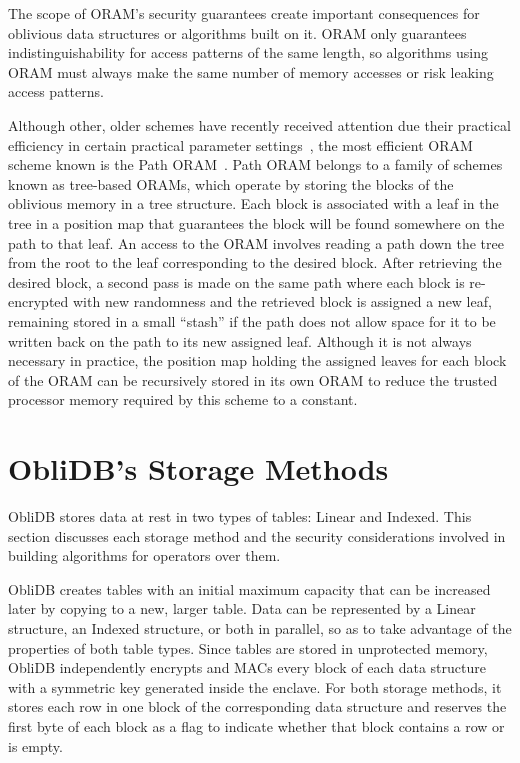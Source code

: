 \documentclass[letterpaper,twocolumn,10pt]{article}
\def\name/{ObliDB}
\begin{document}
The scope of ORAM's security guarantees create important consequences for oblivious data structures or algorithms built on it. ORAM only guarantees indistinguishability for access patterns of the same length, so algorithms using ORAM must always make the same number of memory accesses or risk leaking access patterns.

Although other, older schemes have recently received attention due their practical efficiency in certain practical parameter settings~\cite{ZWR+16}, the most efficient ORAM scheme known is the Path ORAM~\cite{SDS+13}. Path ORAM belongs to a family of schemes known as tree-based ORAMs, which operate by storing the blocks of the oblivious memory in a tree structure. Each block is associated with a leaf in the tree in a position map that guarantees the block will be found somewhere on the path to that leaf. An access to the ORAM involves reading a path down the tree from the root to the leaf corresponding to the desired block. After retrieving the desired block, a second pass is made on the same path where each block is re-encrypted with new randomness and the retrieved block is assigned a new leaf, remaining stored in a small ``stash'' if the path does not allow space for it to be written back on the path to its new assigned leaf. Although it is not always necessary in practice, the position map holding the assigned leaves for each block of the ORAM can be recursively stored in its own ORAM to reduce the trusted processor memory required by this scheme to a constant.

\section{\name/'s Storage Methods}\label{oblivData}
\name/ stores data at rest in two types of tables: Linear and Indexed. This section discusses each storage method and the security considerations involved in building algorithms for operators over them.

\name/ creates tables with an initial maximum capacity that can be increased later by copying to a new, larger table. Data can be represented by a Linear structure, an Indexed structure, or both in parallel, so as to take advantage of the properties of both table types. Since tables are stored in unprotected memory, \name/ independently encrypts and MACs every block of each data structure with a symmetric key generated inside the enclave. For both storage methods, it stores each row in one block of the corresponding data structure and reserves the first byte of each block as a flag to indicate whether that block contains a row or is empty.
\end{document}
